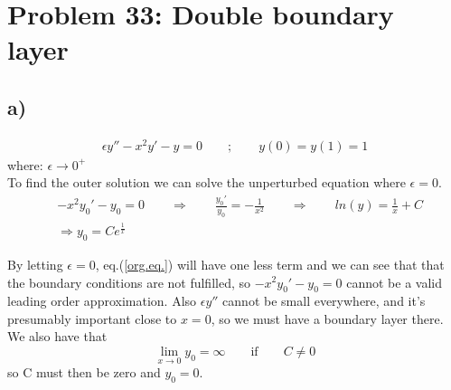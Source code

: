 \documentclass[a4paper,10pt]{article}
\begin{document}
 
 
\lstset{style=mystyle}

\section*{Problem 33: Double boundary layer}
\subsection*{a)}
\begin{align}
\epsilon y'' - x^2 y' - y = 0 \qquad ; \qquad y(0) = y(1) = 1 \label{org.eq.}
\end{align}
where: $\epsilon \rightarrow 0^+$\\
To find the outer solution we can solve the unperturbed equation where $\epsilon = 0$.
\begin{align}
&-x^2 y_0' - y_0 = 0 \qquad \Rightarrow \qquad \frac{y_0'}{y_0}= -\frac{1}{x^2}
\qquad \Rightarrow \qquad ln(y) = \frac{1}{x} + C \nonumber \\
&\Rightarrow y_0 = Ce^{\frac{1}{x}} \label{out.sol.}
\end{align}

By letting $\epsilon=0$, eq.(\ref{org.eq.}) will have one less term and we can see that that the boundary conditions are not fulfilled, so $-x^2y_0' - y_0 = 0$ cannot be a valid leading order approximation. Also $\epsilon y''$ cannot be small everywhere, and it's presumably important close to $x=0$, so we must have a boundary layer there. We also have that \[ \lim_{x \to 0} y_0 = \infty \qquad \text{if} \qquad C \neq 0 \] so C must then be zero and $y_0 = 0$.\\
\end{document}
